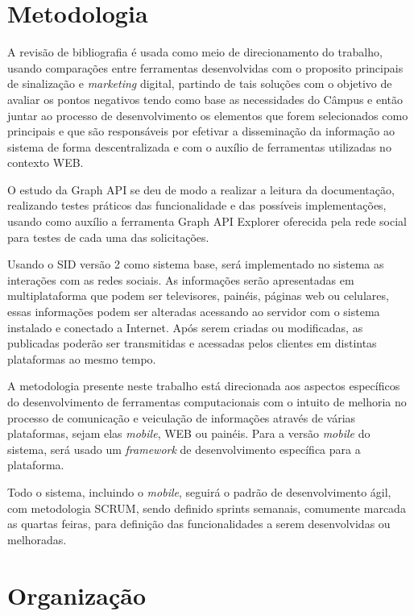 \section{Metodologia}
A revisão de bibliografia é usada como meio de direcionamento do trabalho, usando comparações entre ferramentas desenvolvidas com o proposito principais de sinalização e \textit{marketing} digital, partindo de tais soluções com o objetivo de avaliar os pontos negativos tendo como base as necessidades do Câmpus e então juntar ao processo de desenvolvimento os elementos que forem selecionados como principais e que são responsáveis por efetivar a disseminação da informação ao sistema de forma descentralizada e com o auxílio de ferramentas utilizadas no contexto WEB.

O estudo da Graph API se deu de modo a realizar a leitura da documentação, realizando testes práticos das funcionalidade e das possíveis implementações, usando como auxílio a ferramenta Graph API Explorer oferecida pela rede social para testes de cada uma das solicitações.
	 
Usando o SID versão 2 como sistema base, será implementado no sistema as interações com as redes sociais. As informações serão apresentadas em multiplataforma que podem ser televisores, painéis, páginas web ou celulares, essas informações podem ser alteradas acessando ao servidor com o sistema instalado e conectado a Internet. Após serem criadas ou modificadas, as publicadas poderão ser transmitidas e acessadas pelos clientes em distintas plataformas ao mesmo tempo.

A metodologia presente neste trabalho está direcionada aos aspectos específicos do desenvolvimento de ferramentas computacionais com o intuito de melhoria no processo de comunicação e veiculação de informações através de várias plataformas, sejam elas \textit{mobile}, WEB ou painéis. Para a versão \textit{mobile} do sistema, será usado um \textit{framework} de desenvolvimento específica para a plataforma.

Todo o sistema, incluindo o \textit{mobile}, seguirá o padrão de desenvolvimento ágil, com metodologia SCRUM, sendo definido sprints semanais, comumente marcada as quartas feiras, para definição das funcionalidades a serem desenvolvidas ou melhoradas. 

\section{Organização}
